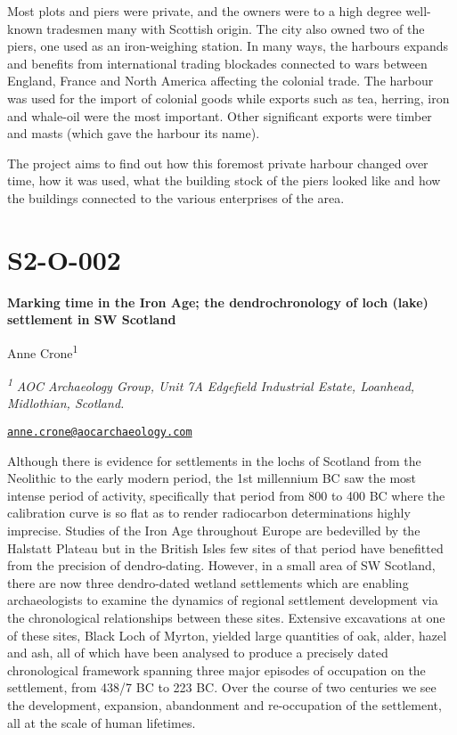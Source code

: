 \documentclass[
]{book}
\begin{document}
Most plots and piers were private, and the owners were to a high degree well-known tradesmen many with Scottish origin. The city also owned two of the piers, one used as an iron-weighing station. In many ways, the harbours expands and benefits from international trading blockades connected to wars between England, France and North America affecting the colonial trade. The harbour was used for the import of colonial goods while exports such as tea, herring, iron and whale-oil were the most important. Other significant exports were timber and masts (which gave the harbour its name).

The project aims to find out how this foremost private harbour changed over time, how it was used, what the building stock of the piers looked like and how the buildings connected to the various enterprises of the area.

\hypertarget{s2-o-002}{%
\section*{S2-O-002}\label{s2-o-002}}

\textbf{Marking time in the Iron Age; the dendrochronology of loch (lake) settlement in SW Scotland}

Anne Crone\textsuperscript{1}

\textsuperscript{\emph{1}} \emph{AOC Archaeology Group, Unit 7A Edgefield Industrial Estate, Loanhead, Midlothian, Scotland.}

\href{mailto:anne.crone@aocarchaeology.com}{\nolinkurl{anne.crone@aocarchaeology.com}}

Although there is evidence for settlements in the lochs of Scotland from the Neolithic to the early modern period, the 1st millennium BC saw the most intense period of activity, specifically that period from 800 to 400 BC where the calibration curve is so flat as to render radiocarbon determinations highly imprecise. Studies of the Iron Age throughout Europe are bedevilled by the Halstatt Plateau but in the British Isles few sites of that period have benefitted from the precision of dendro-dating. However, in a small area of SW Scotland, there are now three dendro-dated wetland settlements which are enabling archaeologists to examine the dynamics of regional settlement development via the chronological relationships between these sites. Extensive excavations at one of these sites, Black Loch of Myrton, yielded large quantities of oak, alder, hazel and ash, all of which have been analysed to produce a precisely dated chronological framework spanning three major episodes of occupation on the settlement, from 438/7 BC to 223 BC. Over the course of two centuries we see the development, expansion, abandonment and re-occupation of the settlement, all at the scale of human lifetimes.
\end{document}
